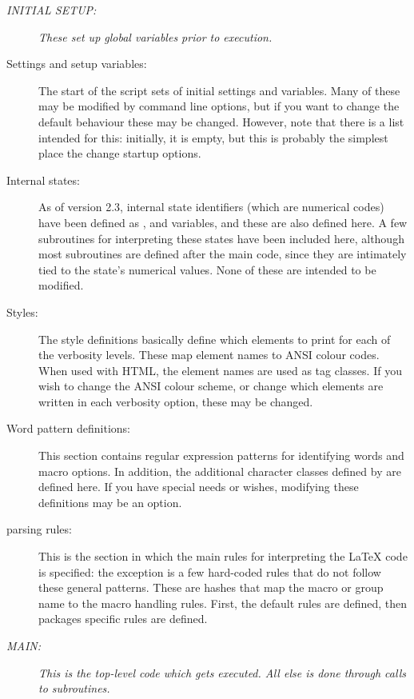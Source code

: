 \documentclass{article}
\begin{document}
\begin{description}

\item[\em INITIAL SETUP:] \textit{These set up global variables prior to execution.}

\item[Settings and setup variables:] The start of the script sets of initial settings and variables. Many of these may be modified by command line options, but if you want to change the default behaviour these may be changed. However, note that there is a list  intended for this: initially, it is empty, but this is probably the simplest place the change startup options.

\item[Internal states:] As of version 2.3, internal state identifiers (which are numerical codes) have been defined as ,  and  variables, and these are also defined here. A few subroutines for interpreting these states have been included here, although most subroutines are defined after the main code, since they are intimately tied to the state's numerical values. None of these are intended to be modified.

\item[Styles:] The style definitions basically define which elements to print for each of the verbosity levels. These map element names to ANSI colour codes. When used with HTML, the element names are used as tag classes. If you wish to change the ANSI colour scheme, or change which elements are written in each verbosity option, these may be changed.

\item[Word pattern definitions:] This section contains regular expression patterns for identifying words and macro options. In addition, the additional character classes defined by \TeXcount{} are defined here. If you have special needs or wishes, modifying these definitions may be an option.

\item[\TeXcount{} parsing rules:] This is the section in which the main rules for interpreting the \LaTeX{} code is specified: the exception is a few hard-coded rules that do not follow these general patterns. These are hashes that map the macro or group name to the macro handling rules. First, the default rules are defined, then packages specific rules are defined.

\item[\em MAIN:] \textit{This is the top-level code which gets executed. All else is done through calls to subroutines.}


\end{description}
\end{document}
